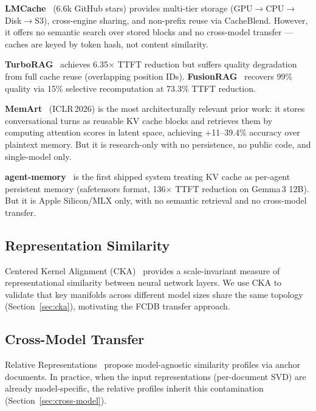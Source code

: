 \documentclass[11pt,twocolumn]{article}
\newcommand{\fcdb}{\textsc{FCDB}}
\begin{document}
\textbf{LMCache}~\citep{lmcache} (6.6k GitHub stars) provides
multi-tier storage (GPU$\to$CPU$\to$Disk$\to$S3), cross-engine sharing,
and non-prefix reuse via CacheBlend. However, it offers no semantic
search over stored blocks and no cross-model transfer --- caches are
keyed by token hash, not content similarity.

\textbf{TurboRAG}~\citep{turborag} achieves 6.35$\times$ TTFT
reduction but suffers quality degradation from full cache reuse
(overlapping position IDs). \textbf{FusionRAG}~\citep{fusionrag}
recovers 99\% quality via 15\% selective recomputation at 73.3\% TTFT
reduction.

\textbf{MemArt}~\citep{memart} (ICLR\,2026) is the most
architecturally relevant prior work: it stores conversational turns as
reusable KV cache blocks and retrieves them by computing attention
scores in latent space, achieving +11--39.4\% accuracy over plaintext
memory. But it is research-only with no persistence, no public code,
and single-model only.

\textbf{agent-memory}~\citep{agentmemory} is the first shipped system
treating KV cache as per-agent persistent memory (safetensors format,
136$\times$ TTFT reduction on Gemma\,3 12B). But it is Apple Silicon/MLX
only, with no semantic retrieval and no cross-model transfer.

\subsection{Representation Similarity}

Centered Kernel Alignment (CKA)~\citep{kornblith2019} provides a
scale-invariant measure of representational similarity between neural
network layers. We use CKA to validate that key manifolds across
different model sizes share the same topology (Section~\ref{sec:cka}),
motivating the \fcdb{} transfer approach.

\subsection{Cross-Model Transfer}

Relative Representations~\citep{moschella2023} propose model-agnostic
similarity profiles via anchor documents. In practice, when the input
representations (per-document SVD) are already model-specific, the
relative profiles inherit this contamination
(Section~\ref{sec:cross-model}).

\end{document}
